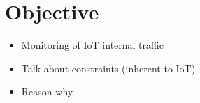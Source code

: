 \section{Objective}

\begin{itemize}
	\item Monitoring of IoT internal traffic
	\item Talk about constraints (inherent to IoT)
	\item Reason why 
\end{itemize}
